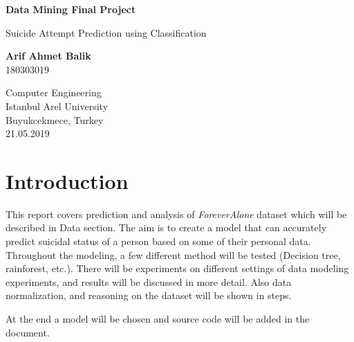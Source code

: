 \documentclass{article}
\begin{document}
\begin{titlepage}
    \begin{center}
        \vspace*{5cm}
 
        \Huge
        \textbf{Data Mining Final Project}
 
        \vspace{0.5cm}
        \LARGE
        Suicide Attempt Prediction using Classification
 
        \vspace{1.5cm}
 
        \textbf{Arif Ahmet Balik}\\
        180303019
 
        \vfill
 
 
        \vspace{0.8cm}
 
 
        \Large
        Computer Engineering\\
        Istanbul Arel University\\
        Buyukcekmece, Turkey\\
        21.05.2019
 
    \end{center}
\end{titlepage}

\section*{Introduction} %

This report covers prediction and analysis of \textit{ForeverAlone} dataset which will be described in Data section. The aim is to create a model that can accurately predict suicidal status of a person based on some of their personal data. Throughout the modeling, a few different method will be tested (Decision tree, rainforest, etc.). There will be experiments on different settings of data modeling experiments, and results will be discussed in more detail. Also data normalization, and reasoning on the dataset will be shown in steps.

At the end a model will be chosen and source code will be added in the document. 


\end{document}
